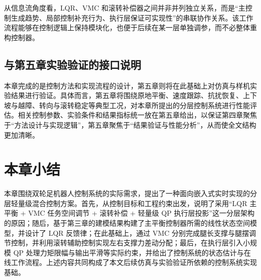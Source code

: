 从信息流角度看，LQR、VMC 和滚转补偿器之间并非并列独立关系，而是“主控制生成趋势、局部控制补充行为、执行层保证可实现性”的串联协作关系。该工作流程能够在控制逻辑上保持模块化，也便于后续在某一层单独调参，而不必整体重构控制器。

\subsection{与第五章实验验证的接口说明}

本章完成的是控制方法和实现流程的设计，第五章则将在此基础上对仿真与样机实验结果进行验证。具体而言，第五章将围绕原地平衡、速度跟踪、抗扰恢复、上下坡与越障、转向与滚转稳定等典型工况，对本章所提出的分层控制系统进行性能评估。相关控制参数、实验条件和结果指标统一放在第五章给出，以保证第四章聚焦于“方法设计与实现逻辑”，第五章聚焦于“结果验证与性能分析”，从而使全文结构更加清晰。

\section{本章小结}

本章围绕双轮足机器人控制系统的实际需求，提出了一种面向嵌入式实时实现的分层轻量级混合控制方案。首先，从控制目标和工程约束出发，说明了采用“LQR 主平衡 + VMC 任务空间调节 + 滚转补偿 + 轻量级 QP 执行层投影”这一分层架构的原因；随后，基于第三章的建模结果构建了主平衡控制器所需的线性状态空间模型，并设计了 LQR 反馈律；在此基础上，通过 VMC 分别完成腿长支撑与腿摆调节控制，并利用滚转辅助控制实现左右支撑力差动分配；最后，在执行层引入小规模 QP 处理力矩限幅与输出平滑等实际约束，并给出了控制系统的状态估计与在线工作流程。上述内容共同构成了本文后续仿真与实验验证所依赖的控制系统实现基础。
